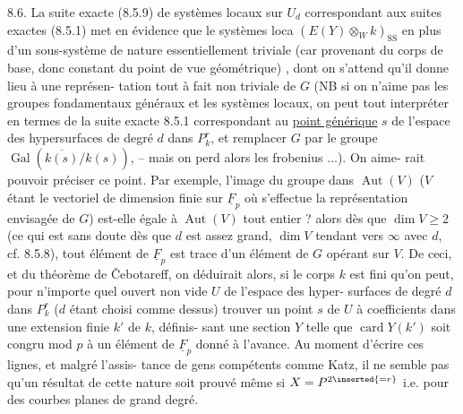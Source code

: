 8.6. La suite exacte (8.5.9) de systèmes locaux sur $U_d$ correspondant
aux suites exactes (8.5.1) met en évidence que le systèmes loca 
 $(E(Y)\otimes_W k)_{\mathrm{SS}}$  en plus d'un sous-système  de nature essentiellement triviale (car provenant
du corps de base, donc constant du point de vue géométrique)  
, dont on s'attend qu'il donne lieu à une représen-
tation tout à fait non triviale de $G$ (NB si on n'aime pas les groupes
fondamentaux généraux et les systèmes locaux, on peut tout interpréter
en termes de la suite exacte 8.5.1 correspondant au \uline{point générique} $s$ de
l'espace des hypersurfaces de degré $d$ dans $P^r_k$, et remplacer $G$ par le
groupe $\operatorname{Gal}(\overline{k(s)}/k(s))$, -- mais on perd alors les frobenius $\ldots$). On aime-
rait pouvoir préciser ce point.  Par exemple, l'image du groupe 
 dans $\operatorname{Aut}(V)$ ($V$ étant le  vectoriel de dimension finie sur $\underline F_p$ où
s'effectue la représentation envisagée de $G$) est-elle égale à $\operatorname{Aut}(V)$ tout
entier ? 
 alors dès que  $\dim V\geq2$ (ce qui est sans doute 
dès que $d$ est assez grand, $\dim V$ tendant vers $\infty$ avec $d$, cf. 8.5.8),
tout élément de $\underline F_p$ est trace d'un élément de $G$ opérant sur $V$. De ceci,
et du théorème de Čebotareff, on déduirait alors,\deleted{\unsure{,}} si le corps $k$ est fini
qu'on peut, pour n'importe quel ouvert non vide $U$ de l'espace des hyper-
surfaces de degré $d$ dans $P^r_k$ ($d$ étant choisi comme dessus) trouver un
point  $s$ de $U$ à coefficients dans une extension finie $k'$ de $k$, définis-
sant une section $Y$ telle que $\operatorname{card}Y(k')$ soit congru mod $p$ à un élément
de $\underline F_p$ donné à l'avance. Au moment d'écrire ces lignes, et malgré l'assis-
tance de gens compétents comme Katz, il ne semble pas qu'un résultat de
cette nature soit prouvé\deleted{,}\inserted{(} même si $X=P^{2\inserted{=r}}$ i.e. pour des courbes planes  de
grand degré\inserted{)}. 

